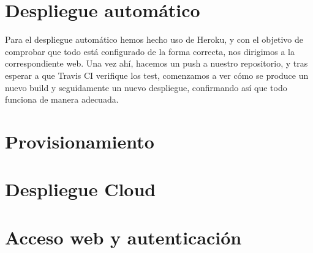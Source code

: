 \section {Despliegue automático}
Para el despliegue automático hemos hecho uso de Heroku, y con el objetivo de comprobar que todo está configurado de la forma correcta, nos dirigimos a la correspondiente web. Una vez ahí, hacemos un push a nuestro repositorio, y tras esperar a que Travis CI verifique los test, comenzamos a ver cómo se produce un nuevo build y seguidamente un nuevo despliegue, confirmando así que todo funciona de manera adecuada.
\section {Provisionamiento}
\section {Despliegue Cloud}
\section {Acceso web y autenticación}

